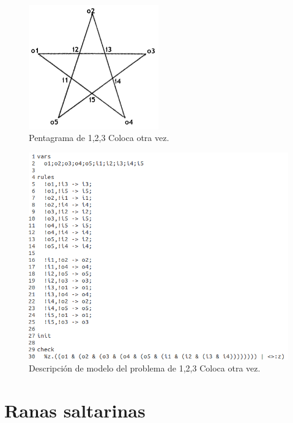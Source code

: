 \begin{figure}[H]
  \centering
  \includegraphics[width=0.5\textwidth]{Figures/pentagram.png}
  \caption{Pentagrama de 1,2,3 Coloca otra vez.}
  \label{fig:pentagrama}
\end{figure}

\begin{figure}[H]
  \centering
  \includegraphics[width=1\textwidth]{Figures/estrella.png}
  \caption{Descripción de modelo del problema de 1,2,3 Coloca otra vez.}
  \label{fig:estrella}
\end{figure}

\section{Ranas saltarinas}

